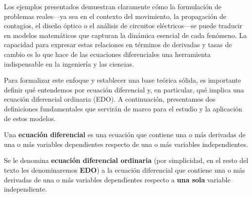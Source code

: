 Los ejemplos presentados demuestran claramente cómo la formulación de problemas reales—ya sea en el contexto del movimiento, la propagación de contagios, el diseño óptico o el análisis de circuitos eléctricos—se puede traducir en modelos matemáticos que capturan la dinámica esencial de cada fenómeno. La capacidad para expresar estas relaciones en términos de derivadas y tasas de cambio es lo que hace de las ecuaciones diferenciales una herramienta indispensable en la ingeniería y las ciencias.

Para formalizar este enfoque y establecer una base teórica sólida, es importante definir qué entendemos por ecuación diferencial y, en particular, qué implica una ecuación diferencial ordinaria (EDO). A continuación, presentamos dos definiciones fundamentales que servirán de marco para el estudio y la aplicación de estos modelos.
\begin{definition}{}{}
    Una \textbf{ecuación diferencial} es una ecuación que contiene una o más derivadas de una o más variables dependientes respecto de una o más variables independientes.
\end{definition}

\begin{definition}{}{}
    Se le denomina \textbf{ecuación diferencial ordinaria} (por simplicidad, en el resto del texto les denominaremos \textbf{EDO}) a la ecuación diferencial que contiene una o más derivadas de una o más variables dependientes respecto a \textbf{una sola} variable independiente.
\end{definition}